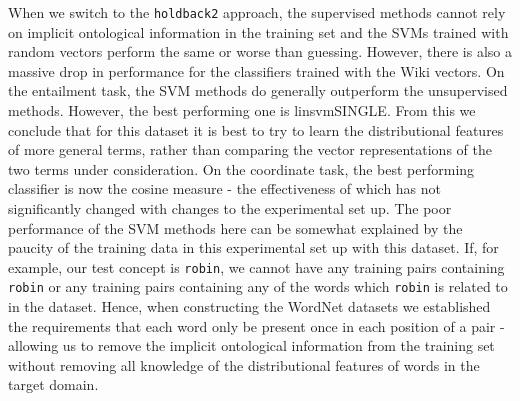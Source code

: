 \documentclass[11pt]{article}
\begin{document}
When we switch to the \texttt{holdback2} approach, the supervised methods cannot rely on implicit ontological information in the training set and the SVMs trained with random vectors perform the same or worse than guessing.  However, there is also a massive drop in performance for the classifiers trained with the Wiki vectors.   On the entailment task, the SVM methods do generally outperform the unsupervised methods.  However, the best performing one is linsvmSINGLE.  From this we conclude that for this dataset it is best to try to learn the distributional features of more general terms, rather than comparing the vector representations of the two terms under consideration.   On the coordinate task, the best performing classifier is now the cosine measure - the effectiveness of which has not significantly changed with changes to the experimental set up.   The poor performance of the SVM methods here can be somewhat explained by the paucity of the training data in this experimental set up with this dataset.  If, for example, our test concept is \texttt{robin}, we cannot have any training pairs containing \texttt{robin} or any training pairs containing any of the words which \texttt{robin} is related to in the dataset.  Hence, when constructing the WordNet datasets we established the requirements that each word only be present once in each position of a pair - allowing us to remove the implicit ontological information from the training set without removing all knowledge of the distributional features of words in the target domain.

\end{document}
